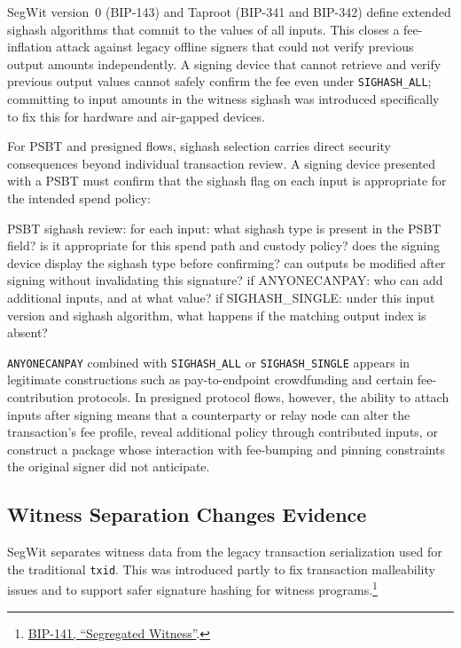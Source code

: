 SegWit version~0 (BIP-143) and Taproot (BIP-341 and BIP-342) define extended sighash algorithms that commit to the values of all inputs. This closes a fee-inflation attack against legacy offline signers that could not verify previous output amounts independently. A signing device that cannot retrieve and verify previous output values cannot safely confirm the fee even under \texttt{SIGHASH\_ALL}; committing to input amounts in the witness sighash was introduced specifically to fix this for hardware and air-gapped devices.

For PSBT and presigned flows, sighash selection carries direct security consequences beyond individual transaction review. A signing device presented with a PSBT must confirm that the sighash flag on each input is appropriate for the intended spend policy:

\begin{codeblock}
PSBT sighash review:
    for each input:
        what sighash type is present in the PSBT field?
        is it appropriate for this spend path and custody policy?
        does the signing device display the sighash type before confirming?
        can outputs be modified after signing without invalidating this signature?
        if ANYONECANPAY: who can add additional inputs, and at what value?
        if SIGHASH_SINGLE: under this input version and sighash algorithm,
            what happens if the matching output index is absent?
\end{codeblock}

\texttt{ANYONECANPAY} combined with \texttt{SIGHASH\_ALL} or \texttt{SIGHASH\_SINGLE} appears in legitimate constructions such as pay-to-endpoint crowdfunding and certain fee-contribution protocols. In presigned protocol flows, however, the ability to attach inputs after signing means that a counterparty or relay node can alter the transaction's fee profile, reveal additional policy through contributed inputs, or construct a package whose interaction with fee-bumping and pinning constraints the original signer did not anticipate.

\subsection{Witness Separation Changes Evidence}

SegWit separates witness data from the legacy transaction serialization used for the traditional \texttt{txid}. This was introduced partly to fix transaction malleability issues and to support safer signature hashing for witness programs.\footnote{\href{https://github.com/bitcoin/bips/blob/master/bip-0141.mediawiki}{BIP-141, ``Segregated Witness''}.}

